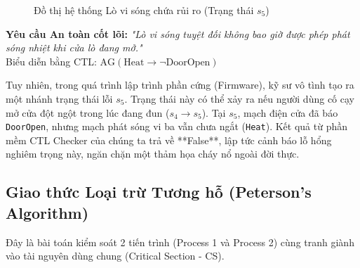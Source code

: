 \documentclass[12pt,a4paper]{article}
\begin{document}
\begin{figure}[h!]
\centering
{}
\caption{Đồ thị hệ thống Lò vi sóng chứa rủi ro (Trạng thái $s_5$)}
\end{figure}

\textbf{Yêu cầu An toàn cốt lõi:} \textit{"Lò vi sóng tuyệt đối không bao giờ được phép phát sóng nhiệt khi cửa lò đang mở."} \\
Biểu diễn bằng CTL: $\text{AG}(\text{Heat} \rightarrow \neg \text{DoorOpen})$

Tuy nhiên, trong quá trình lập trình phần cứng (Firmware), kỹ sư vô tình tạo ra một nhánh trạng thái lỗi $s_5$. Trạng thái này có thể xảy ra nếu người dùng cố cạy mở cửa đột ngột trong lúc đang đun ($s_4 \rightarrow s_5$). Tại $s_5$, mạch điện cửa đã báo \texttt{DoorOpen}, nhưng mạch phát sóng vi ba vẫn chưa ngắt (\texttt{Heat}).
Kết quả từ phần mềm CTL Checker của chúng ta trả về **False**, lập tức cảnh báo lỗ hổng nghiêm trọng này, ngăn chặn một thảm họa cháy nổ ngoài đời thực.

\newpage
\subsection{Giao thức Loại trừ Tương hỗ (Peterson's Algorithm)}
Đây là bài toán kiểm soát 2 tiến trình (Process 1 và Process 2) cùng tranh giành vào tài nguyên dùng chung (Critical Section - CS). 
\end{document}
